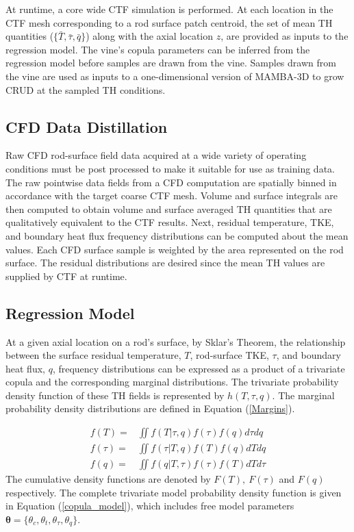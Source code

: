 \documentclass{anstrans}
\begin{document}
At runtime,
a core wide CTF simulation is performed. At each location in the CTF mesh corresponding to
a rod surface patch centroid, the set of mean TH quantities ($\{ \bar T, \bar \tau, \bar q \}$) along with the axial location $z$,
are provided as inputs to the regression model. The vine's copula
parameters can be inferred from the regression model before samples are drawn from the vine.
Samples drawn from the vine are used as inputs to a
one-dimensional version of MAMBA-3D to grow CRUD at the sampled TH
conditions.

\subsection{CFD Data Distillation}
Raw CFD rod-surface field data acquired at a wide variety of operating conditions must be post processed to
make it suitable for use as training data.  The raw pointwise data fields from a CFD computation
are spatially binned in accordance with the target coarse CTF mesh.  Volume and surface integrals are then computed
to obtain volume and surface averaged TH quantities that are qualitatively equivalent to the CTF results.
Next, residual temperature, TKE, and boundary heat flux frequency distributions can be computed about the mean values.  Each CFD surface sample is weighted by the area represented on the rod surface.
The residual distributions are desired since the mean TH values are
supplied by CTF at runtime.

\subsection{Regression Model} At a given axial location on a rod's surface, by Sklar's Theorem, the relationship between the surface residual temperature, $T$, rod-surface TKE, $\tau$, and boundary heat flux, $q$, frequency distributions can be expressed as a product of a trivariate copula and the corresponding marginal distributions.
The trivariate probability density function of these TH fields is represented by $h(T, \tau, q)$.
The marginal probability density distributions are defined in Equation (\ref{Margins}).

\begin{eqnarray}
f(T) =&  \iint f(T|\tau, q) f(\tau)f(q) d\tau dq  \nonumber \\
 f(\tau) =& \iint f(\tau | T, q) f(T)f(q) dT dq  \nonumber \\
  f(q) =& \iint f(q| T, \tau) f(\tau)f(T) dT d\tau
  \label{Margins}
  \end{eqnarray}
The cumulative density functions are denoted by $F(T),\ F(\tau)$ and $F(q)$ respectively. The complete trivariate model
probability density function is given in Equation (\ref{copula_model}), which includes free model parameters $\bm \theta = \{\theta_c, \theta_t, \theta_{\tau}, \theta_q\}$.
\end{document}
